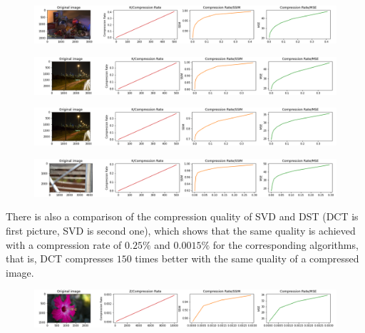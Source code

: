 \begin{figure}[H]
  \centering
  \includegraphics[width=\linewidth]{HDR (1).png}
  \label{fig:exmp_15}
\end{figure}

\begin{figure}[H]
  \centering
  \includegraphics[width=\linewidth]{Nightshot ISO 100.png}
  \label{fig:exmp_16}
\end{figure}

\begin{figure}[H]
  \centering
  \includegraphics[width=\linewidth]{Nightshot ISO 1600.png}
  \label{fig:exmp_17}
\end{figure}

\begin{figure}[H]
  \centering
  \includegraphics[width=\linewidth]{Spider-web.png}
  \label{fig:exmp_18}
\end{figure}

There is also a comparison of the compression quality of SVD  and DST (DCT is first picture, SVD is second one), which shows that the same quality is achieved with a compression rate of $0.25\%$ and $0.0015\%$ for the corresponding algorithms, that is, DCT compresses $150$ times better with the same quality of a compressed image.

\begin{figure}[H]
  \centering
  \includegraphics[width=\linewidth]{flower-dct.png}
  \label{fig:exmp_19}
\end{figure}

